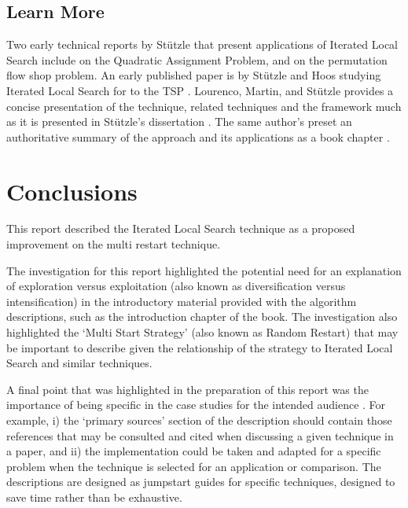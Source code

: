 \documentclass[a4paper, 11pt]{article}
\begin{document}
% 
% 
\subsection{Learn More}
Two early technical reports by St\"utzle that present applications of Iterated Local Search include \cite{Stuetzle1999} on the Quadratic Assignment Problem, and \cite{Stutzle1998a} on the permutation flow shop problem. An early published paper is by St\"utzle and Hoos studying Iterated Local Search for to the TSP \cite{Stutzle1999}. 
Lourenco, Martin, and St\"utzle provides a concise presentation of the technique, related techniques and the framework much as it is presented in St\"utzle's dissertation \cite{Lourenco2001}.
The same author's preset an authoritative summary of the approach and its applications as a book chapter \cite{Ramalhinho-Lourenco2003}.

% 
% 
\section{Conclusions}
\label{sec:conclusions}
This report described the Iterated Local Search technique as a proposed improvement on the multi restart technique.

The investigation for this report highlighted the potential need for an explanation of exploration versus exploitation (also known as diversification versus intensification) in the introductory material provided with the algorithm descriptions, such as the introduction chapter of the book.
The investigation also highlighted the `Multi Start Strategy' (also known as Random Restart) that may be important to describe given the relationship of the strategy to Iterated Local Search and similar techniques. 

A final point that was highlighted in the preparation of this report was the importance of being specific in the case studies for the intended audience \cite{Brownlee2010}. For example, i) the `primary sources' section of the description should contain those references that may be consulted and cited when discussing a given technique in a paper, and ii) the implementation could be taken and adapted for a specific problem when the technique is selected for an application or comparison. The descriptions are designed as jumpstart guides for specific techniques, designed to save time rather than be exhaustive.
\end{document}
